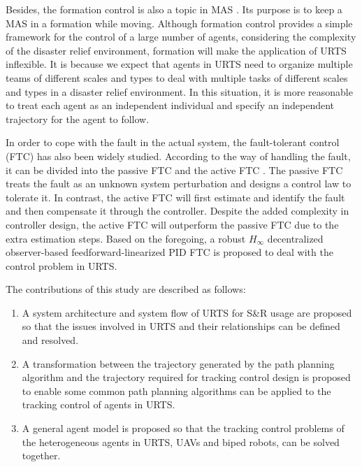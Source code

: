 \documentclass{ieeeaccess}
\begin{document}
Besides, the formation control is also a topic in MAS \cite{wang2022consensus}. Its purpose is to keep a MAS in a formation while moving. Although formation control provides a simple framework for the control of a large number of agents, considering the complexity of the disaster relief environment, formation will make the application of URTS inflexible. It is because we expect that agents in URTS need to organize multiple teams of different scales and types to deal with multiple tasks of different scales and types in a disaster relief environment. In this situation, it is more reasonable to treat each agent as an independent individual and specify an independent trajectory for the agent to follow.

In order to cope with the fault in the actual system, the fault-tolerant control (FTC) has also been widely studied. According to the way of handling the fault, it can be divided into the passive FTC and the active FTC \cite{6669235}. The passive FTC treats the fault as an unknown system perturbation and designs a control law to tolerate it. In contrast, the active FTC will first estimate and identify the fault and then compensate it through the controller. Despite the added complexity in controller design, the active FTC will outperform the passive FTC due to the extra estimation steps. Based on the foregoing, a robust $H_\infty$ decentralized observer-based feedforward-linearized PID FTC is proposed to deal with the control problem in URTS.

The contributions of this study are described as follows:
\begin{enumerate}
    \item A system architecture and system flow of URTS for S\&R usage are proposed so that the issues involved in URTS and their relationships can be defined and resolved.
    \item A transformation between the trajectory generated by the path planning algorithm and the trajectory required for tracking control design is proposed to enable some common path planning algorithms can be applied to the tracking control of agents in URTS.
    \item A general agent model is proposed so that the tracking control problems of the heterogeneous agents in URTS, UAVs and biped robots, can be solved together.
\end{enumerate}
\end{document}
